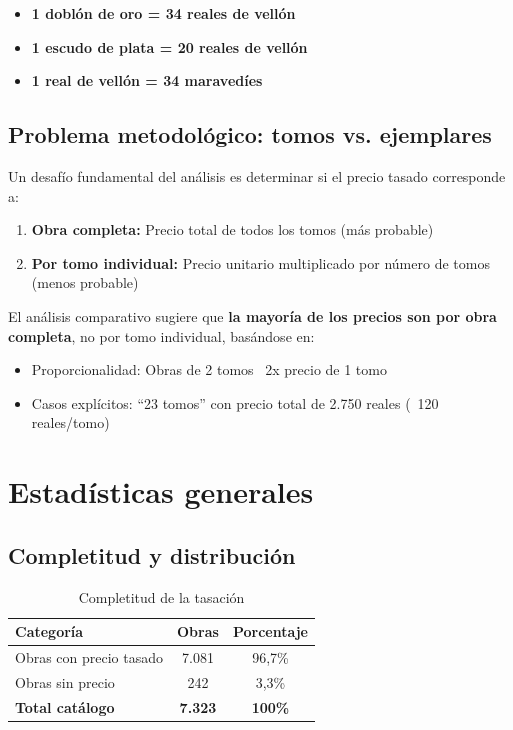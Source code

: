 \documentclass[12pt,a4paper]{article}
\begin{document}
\begin{itemize}
    \item \textbf{1 doblón de oro = 34 reales de vellón}
    \item \textbf{1 escudo de plata = 20 reales de vellón}
    \item \textbf{1 real de vellón = 34 maravedíes}
\end{itemize}

\subsection{Problema metodológico: tomos vs. ejemplares}

Un desafío fundamental del análisis es determinar si el precio tasado corresponde a:

\begin{enumerate}
    \item \textbf{Obra completa:} Precio total de todos los tomos (más probable)
    \item \textbf{Por tomo individual:} Precio unitario multiplicado por número de tomos (menos probable)
\end{enumerate}

El análisis comparativo sugiere que \textbf{la mayoría de los precios son por obra completa}, no por tomo individual, basándose en:
\begin{itemize}
    \item Proporcionalidad: Obras de 2 tomos ~2x precio de 1 tomo
    \item Casos explícitos: ``23 tomos'' con precio total de 2.750 reales (~120 reales/tomo)
\end{itemize}

\section{Estadísticas generales}

\subsection{Completitud y distribución}

\begin{table}[h]
\centering
\caption{Completitud de la tasación}
\begin{tabular}{lcc}
\toprule
\textbf{Categoría} & \textbf{Obras} & \textbf{Porcentaje} \\
\midrule
Obras con precio tasado & 7.081 & 96,7\% \\
Obras sin precio & 242 & 3,3\% \\
\midrule
\textbf{Total catálogo} & \textbf{7.323} & \textbf{100\%} \\
\bottomrule
\end{tabular}
\end{table}
\end{document}
